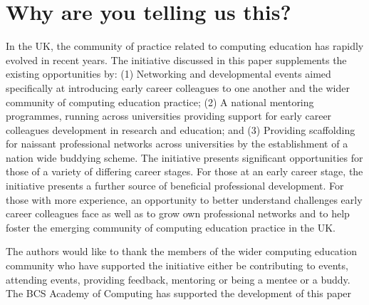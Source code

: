 \documentclass[sigconf]{acmart}
\begin{document}
\section{Why are you telling us this?}
In the UK, the community of practice related to computing education has rapidly evolved in recent years. The initiative discussed in this paper supplements the existing opportunities by: (1) Networking and developmental events aimed specifically at introducing early career colleagues to one another and the wider community of computing education practice; (2) A national mentoring programmes, running across universities providing support for early career colleagues development in research and education; and (3) Providing scaffolding for naissant professional networks across universities by the establishment of a nation wide buddying scheme. The initiative presents significant opportunities for those of a variety of differing career stages. For those at an early career stage, the initiative presents a further source of beneficial professional development. For those with more experience, an opportunity to better understand challenges early career colleagues face as well as to grow own professional networks and to help foster the emerging community of computing education practice in the UK. 

\begin{acks}
	
	The authors would like to thank the members of the wider computing education community who have supported the initiative either be contributing to events, attending events, providing feedback, mentoring or being a mentee or a buddy.
	The BCS Academy of Computing has supported the development of this paper
	
	
\end{acks}




\end{document}
